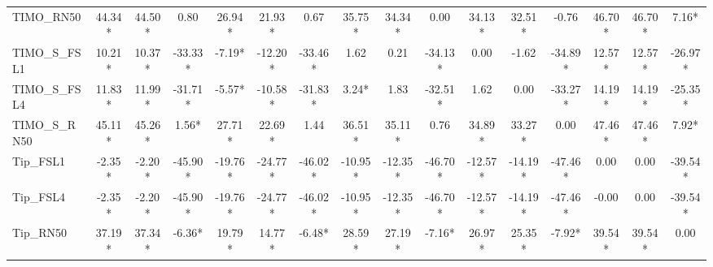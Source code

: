 \documentclass[conference,6pt]{IEEEtran}
\begin{document}
\begin{table}[H]
{\begin{tabular}{@{}l*{15}{c}@{}}
TIMO\_RN50 & 44.34* & 44.50* & 0.80 & 26.94* & 21.93* & 0.67 & 35.75* & 34.34* & 0.00 & 34.13* & 32.51* & -0.76 & 46.70* & 46.70* & 7.16* \\
TIMO\_S\_FSL1 & 10.21* & 10.37* & -33.33* & -7.19* & -12.20* & -33.46* & 1.62 & 0.21 & -34.13* & 0.00 & -1.62 & -34.89* & 12.57* & 12.57* & -26.97* \\
TIMO\_S\_FSL4 & 11.83* & 11.99* & -31.71* & -5.57* & -10.58* & -31.83* & 3.24* & 1.83 & -32.51* & 1.62 & 0.00 & -33.27* & 14.19* & 14.19* & -25.35* \\
TIMO\_S\_RN50 & 45.11* & 45.26* & 1.56* & 27.71* & 22.69* & 1.44 & 36.51* & 35.11* & 0.76 & 34.89* & 33.27* & 0.00 & 47.46* & 47.46* & 7.92* \\
Tip\_FSL1 & -2.35* & -2.20* & -45.90* & -19.76* & -24.77* & -46.02* & -10.95* & -12.35* & -46.70* & -12.57* & -14.19* & -47.46* & 0.00 & 0.00 & -39.54* \\
Tip\_FSL4 & -2.35* & -2.20* & -45.90* & -19.76* & -24.77* & -46.02* & -10.95* & -12.35* & -46.70* & -12.57* & -14.19* & -47.46* & -0.00 & 0.00 & -39.54* \\
Tip\_RN50 & 37.19* & 37.34* & -6.36* & 19.79* & 14.77* & -6.48* & 28.59* & 27.19* & -7.16* & 26.97* & 25.35* & -7.92* & 39.54* & 39.54* & 0.00 \\
\bottomrule
\end{tabular}%
}
\end{table}

\FloatBarrier
\end{document}
